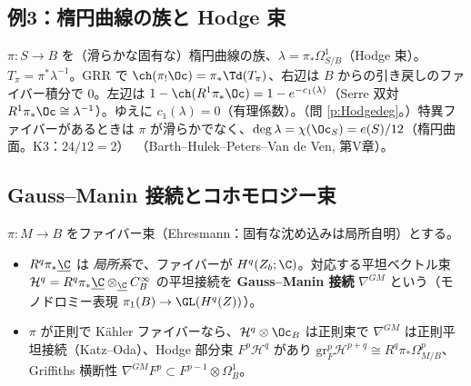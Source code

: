 \subsection{例3：楕円曲線の族と Hodge 束}
$\pi:S\to B$ を（滑らかな固有な）楕円曲線の族、$\lambda=\pi_*\Omega^1_{S/B}$（Hodge 束）。$T_\pi=\pi^*\lambda^{-1}$。GRR で $\ch(\pi_!\Oc)=\pi_*\Td(T_\pi)$、右辺は $B$ からの引き戻しのファイバー積分で $0$。左辺は $1-\ch(R^1\pi_*\Oc)=1-e^{-c_1(\lambda)}$（Serre 双対 $R^1\pi_*\Oc\cong\lambda^{-1}$）。ゆえに $c_1(\lambda)=0$（有理係数）。（問 \ref{p:Hodgedeg}。）特異ファイバーがあるときは $\pi$ が滑らかでなく、$\deg\lambda=\chi(\Oc_S)=e(S)/12$（楕円曲面。K3：$24/12=2$）\tC\ （Barth--Hulek--Peters--Van de Ven, 第V章）。

\subsection{Gauss--Manin 接続とコホモロジー束}
$\pi:M\to B$ をファイバー束（Ehresmann：固有な沈め込みは局所自明）とする。\tC\
\begin{itemize}
\item $R^q\pi_*\underline\C$ は \emph{局所系}で、ファイバーが $H^q(Z_b;\C)$。対応する平坦ベクトル束 $\mathcal H^q=R^q\pi_*\underline\C\otimes_{\underline\C}C^\infty_B$ の平坦接続を \textbf{Gauss--Manin 接続} $\nabla^{GM}$ という（モノドロミー表現 $\pi_1(B)\to\GL(H^q(Z))$）。
\item $\pi$ が正則で Kähler ファイバーなら、$\mathcal H^q\otimes\Oc_B$ は正則束で $\nabla^{GM}$ は正則平坦接続（Katz--Oda）、Hodge 部分束 $F^p\mathcal H^q$ があり $\mathrm{gr}^p_F\mathcal H^{p+q}\cong R^q\pi_*\Omega^p_{M/B}$、Griffiths 横断性 $\nabla^{GM}F^p\subset F^{p-1}\otimes\Omega^1_B$。
\end{itemize}
